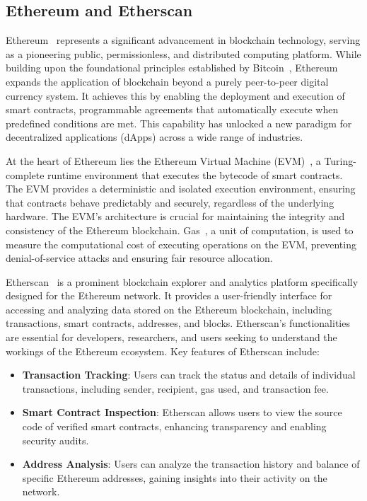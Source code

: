 \documentclass[acmsmall, screen]{acmart}
\begin{document}
	\subsection{Ethereum and Etherscan}

	Ethereum~\cite{ethereum} represents a significant advancement in blockchain technology, serving
	as a pioneering public, permissionless, and distributed computing platform. While building upon the
	foundational principles established by Bitcoin~\cite{Bitcoin}, Ethereum expands the application
	of blockchain beyond a purely peer-to-peer digital currency system. It achieves this by enabling
	the deployment and execution of smart contracts, programmable agreements that automatically
	execute when predefined conditions are met. This capability has unlocked a new paradigm for decentralized
	applications (dApps) across a wide range of industries.

	At the heart of Ethereum lies the Ethereum Virtual Machine (EVM)~\cite{EVM}, a Turing-complete
	runtime environment that executes the bytecode of smart contracts. The EVM provides a deterministic
	and isolated execution environment, ensuring that contracts behave predictably and securely, regardless
	of the underlying hardware. The EVM's architecture is crucial for maintaining the integrity and
	consistency of the Ethereum blockchain. Gas~\cite{Gas}, a unit of computation, is used to measure
	the computational cost of executing operations on the EVM, preventing denial-of-service attacks
	and ensuring fair resource allocation.

	Etherscan~\cite{etherscan} is a prominent blockchain explorer and analytics platform
	specifically designed for the Ethereum network. It provides a user-friendly interface for accessing
	and analyzing data stored on the Ethereum blockchain, including transactions, smart contracts,
	addresses, and blocks. Etherscan's functionalities are essential for developers, researchers,
	and users seeking to understand the workings of the Ethereum ecosystem. Key features of Etherscan
	include:
	\begin{itemize}[leftmargin=0.4cm,topsep=0.1cm]
		\item \textbf{Transaction Tracking}: Users can track the status and details of individual transactions,
		including sender, recipient, gas used, and transaction fee.

		\item \textbf{Smart Contract Inspection}: Etherscan allows users to view the source code of verified
		smart contracts, enhancing transparency and enabling security audits.

		\item \textbf{Address Analysis}: Users can analyze the transaction history and balance of specific
		Ethereum addresses, gaining insights into their activity on the network.
	\end{itemize}
\end{document}
